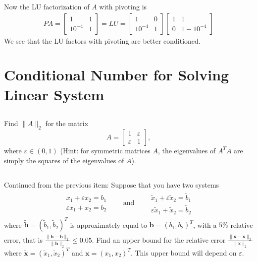 \documentclass[11pt,letterpaper]{report}
\begin{document}
Now the LU factorization of $A$ with pivoting is
\begin{align*}
PA = \begin{bmatrix} 1 & 1 \\ 10^{-4} & 1
  \end{bmatrix} = LU =
  \begin{bmatrix} 1 & 0\\ 10^{-4} & 1
  \end{bmatrix}
  \begin{bmatrix} 1 & 1\\ 0 & 1-10^{-4}
  \end{bmatrix}
\end{align*}
We see that the LU factors with pivoting are better conditioned.

\section{Conditional Number for Solving Linear System}  
\subsection{}
Find $\|{A}\|_2$ for the matrix 
\[
A = \begin{bmatrix} 1 & \varepsilon \\ \varepsilon & 1 \end{bmatrix},
\]where $\varepsilon \in (0,1)$ (Hint: for symmetric matrices $A$, the
eigenvalues of $A^T A$ are simply the squares of the eigenvalues of
$A$).

\subsection{}
Continued from the previous item: Suppose that you have two systems
\begin{align*}
\begin{matrix}
x_1 + \varepsilon x_2 = b_1 \\
 \varepsilon x_1 + x_2 = b_2  
\end{matrix}\qquad \text{and}\qquad
\begin{matrix}
\tilde x_1 + \varepsilon \tilde x_2 = \tilde b_1 \\
 \varepsilon \tilde x_1 + \tilde x_2 = \tilde b_2
\end{matrix}
\end{align*}
where $\tilde{\boldsymbol b} = (\tilde b_1, \tilde b_2)^T$ is
approximately equal to ${\boldsymbol b}=( b_1, b_2)^T$, with a $5\%$
relative error, that is $\frac{\|{\tilde {\boldsymbol b} -
    {\boldsymbol b}}\|_2}{\|{{\boldsymbol b}}\|_2} \leq 0.05$.  Find
an upper bound for the relative error $\frac{\|\tilde {\boldsymbol x}
  - {\boldsymbol x}\|_2}{\|{\boldsymbol x}\|_2}$ where $\tilde
{\boldsymbol x} = (\tilde x_1, \tilde x_2)^T$ and ${\boldsymbol x} =
(x_1,x_2)^T$. This upper bound will depend on $\varepsilon$.
\end{document}
